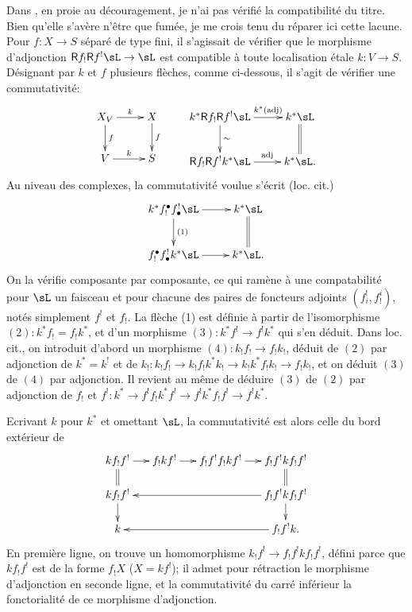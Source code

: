 Dans \cite[XVIII]{sga4}, en proie au d\'ecouragement, je n'ai pas v\'erifi\'e 
la compatibilit\'e du titre. Bien qu'elle s'av\`ere n'\^etre que fum\'ee, je me 
crois tenu du r\'eparer ici cette lacune. Pour $f:X\to S$ s\'epar\'e de type 
fini, il s'agissait de v\'erifier que le morphisme d'adjonction 
$\R f_!\R f^!\sL\to \sL$ est compatible \`a toute localisation \'etale 
$k:V\to S$. D\'esignant par $k$ et $f$ plusieurs fl\`eches, comme ci-dessous, 
il s'agit de v\'erifier une commutativit\'e:
\[\xymatrix{
  X_V \ar[r]^-k \ar[d]^-f 
    & X \ar[d]^-f \\
  V \ar[r]^-k 
    & S 
} \qquad 
\xymatrix{
  k^\ast \R f_! \R f^!\sL \ar[r]^-{k^\ast(\text{adj})} \ar[d]^-\sim 
    & k^\ast \sL \ar@{=}[d] \\
  \R f_! \R f^! k^\ast \sL \ar[r]^-{\text{adj}} 
    & k^\ast \sL \text{.}
}\]
Au niveau des complexes, la commutativit\'e voulue s'\'ecrit (loc. cit.) 
\[\xymatrix{
  k^\ast f_!^\bullet f^!_\bullet \sL \ar[r] \ar[d]^-{(1)} 
    & k^\ast \sL \ar@{=}[d] \\
  f_!^\bullet f^!_\bullet k^\ast \sL \ar[r] 
    & k^\ast \sL \text{.}
}\]
On la v\'erifie composante par composante, ce qui ram\`ene \`a une 
compatabilit\'e pour $\sL$ un faisceau et pour chacune des paires de foncteurs 
adjoints $(f_i^!,f_!^i)$, not\'es simplement $f^!$ et $f_!$. La fl\`eche (1) 
est d\'efinie \`a partir de l'isomorphisme $(2):k^\ast f_!=f_! k^\ast$, et d'un 
morphisme $(3):k^\ast f^! \to f^! k^\ast$ qui s'en d\'eduit. Dans loc. cit., on 
introduit d'abord un morphisme $(4):k_! f_!\to f_! k_!$, d\'eduit de $(2)$ par 
adjonction de $k^\ast=k^!$ et de 
$k_!:k_! f_!\to k_! f_! k^\ast k_!\to k_! k^\ast f_! k_! \to f_! k_!$, et on 
d\'eduit $(3)$ de $(4)$ par adjonction. Il revient au m\^eme de d\'eduire $(3)$ 
de $(2)$ par adjonction de $f_!$ et 
$f^!:k^\ast \to f^! f_! k^\ast f^!\to f^! k^\ast f_! f^! \to f^! k^\ast$. 

Ecrivant $k$ pour $k^\ast$ et omettant $\sL$, la commutativit\'e est alors 
celle du bord ext\'erieur de 
\[\xymatrix@=.5cm{
  k f_! f^! \ar[r] \ar@{=}[d]
    & f_! k f^! \ar[r] 
    & f_! f^! f_! k f^! \ar[r] 
    & f_! f^! k f_! f^! \ar@{=}[d] \\
  k f_! f^! \ar[d] 
    & & & \ar[lll] f_! f^! k f_! f^! \ar[d] \\
  k 
    & & & \ar[lll] f_! f^! k \text{.}
}\]
En premi\`ere ligne, on trouve un homomorphisme 
$k _! f^! \to f_! f^! k f_! f^!$, d\'efini parce que $k f_! f^!$ est de la 
forme $f_! X$ ($X=k f^!$); il admet pour r\'etraction le morphisme 
d'adjonction en seconde ligne, et la commutativit\'e du carr\'e inf\'erieur la 
fonctorialit\'e de ce morphisme d'adjonction. 




